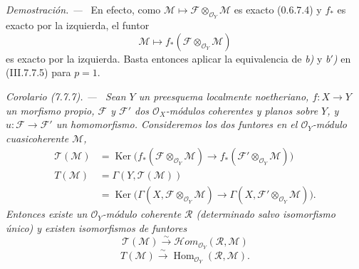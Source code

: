 \documentclass[10pt,oneside]{book}
\newcommand{\sref}[2][]{\textup{(#2)}}
\newenvironment{corollary}[1][]{\par\medskip\noindent\itshape Corolario (#1). ---\ }{\par}
\newenvironment{proof}{\par\medskip\noindent\textit{Demostración. ---\ }}{\par}
\begin{document}
\begin{proof}
En efecto, como $\mathscr M\mapsto
\mathscr F\otimes_{\mathscr O_Y}\mathscr M$ es exacto
\sref[0]{0.6.7.4} y $f_*$ es exacto por la izquierda, el funtor
\[
  \mathscr M\longmapsto
  f_*(\mathscr F\otimes_{\mathscr O_Y}\mathscr M)
\]
es exacto por la izquierda. Basta entonces aplicar la equivalencia de \emph{b)} y
\emph{b$'$)} en \sref{III.7.7.5} para $p=1$.
\end{proof}

\begin{corollary}[7.7.7]
\label{III.7.7.7}
Sean $Y$ un preesquema localmente noetheriano, $f:X\to Y$ un morfismo propio,
$\mathscr F$ y $\mathscr F'$ dos $\mathscr O_X$-módulos coherentes y planos
sobre $Y$, y $u:\mathscr F\to\mathscr F'$ un homomorfismo. Consideremos los
dos funtores en el $\mathscr O_Y$-módulo cuasicoherente $\mathscr M$,
\begin{align*}
  \mathscr T(\mathscr M)
  &=
  \operatorname{Ker}
  \bigl(
    f_*(\mathscr F\otimes_{\mathscr O_Y}\mathscr M)
    \longrightarrow
    f_*(\mathscr F'\otimes_{\mathscr O_Y}\mathscr M)
  \bigr)\\
  T(\mathscr M)
  &=
  \Gamma(Y,\mathscr T(\mathscr M))\\
  &=
  \operatorname{Ker}
  \bigl(
    \Gamma(X,\mathscr F\otimes_{\mathscr O_Y}\mathscr M)
    \longrightarrow
    \Gamma(X,\mathscr F'\otimes_{\mathscr O_Y}\mathscr M)
  \bigr).
\end{align*}
Entonces existe un $\mathscr O_Y$-módulo coherente $\mathscr R$ (determinado
salvo isomorfismo único) y existen isomorfismos de funtores
\[
  \mathscr T(\mathscr M)
  \xrightarrow{\sim}
  \mathscr{H}\!om_{\mathscr O_Y}(\mathscr R,\mathscr M)
  \tag{7.7.7.1}\label{III.7.7.7.1}
\]
\[
  T(\mathscr M)
  \xrightarrow{\sim}
  \operatorname{Hom}_{\mathscr O_Y}(\mathscr R,\mathscr M).
  \tag{7.7.7.2}\label{III.7.7.7.2}
\]
\end{corollary}
\end{document}
